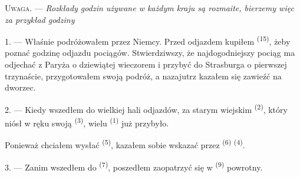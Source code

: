 %
%
%

\VUsaut{4.0mm}
\VUsaut{2.4mm}
\VUsaut{3.4mm}
\textsc{Uwaga.} --- \textit{Rozkłady godzin używane w każdym kraju są rozmaite, bierzemy
więc za przykład godziny} 

1. --- Właśnie podróżowałem przez Niemcy. Przed odjazdem kupiłem  \textsuperscript{(15)}, żeby poznać godzinę odjazdu pociągów.
Stwierdziwszy, że najdogodniejszy pociąg ma odjechać z Paryża o dziewiątej wieczorem i
przybyć do Strasburga o pierwszej trzynaście, przygotowałem swoją podróż, a nazajutrz
kazałem się zawieźć na dworzec.

2. --- Kiedy wszedłem do wielkiej hali odjazdów, za starym wiejskim 
\textsuperscript{(2)}, który niósł w ręku swoją 
\textsuperscript{(3)}, wielu  \textsuperscript{(1)} już przybyło.

Ponieważ chciałem wysłać  \textsuperscript{(5)}, kazałem
sobie wskazać przez  \textsuperscript{(6)}  \textsuperscript{(4)}.

3. --- Zanim wszedłem do  \textsuperscript{(7)}, poszedłem zaopatrzyć
się w  \textsuperscript{(9)} powrotny.

